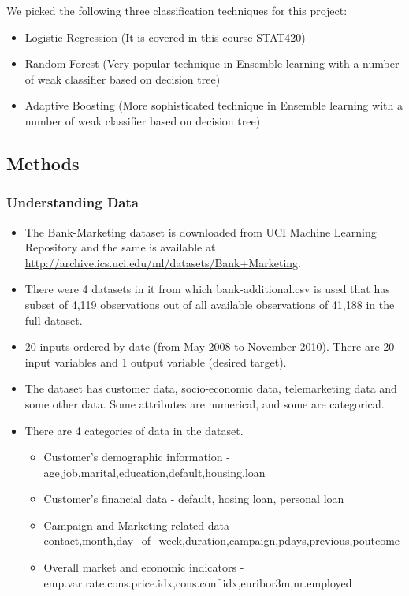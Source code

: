 \documentclass[
]{article}
\begin{document}
We picked the following three classification techniques for this
project:

\begin{itemize}
\item
  Logistic Regression (It is covered in this course STAT420)
\item
  Random Forest (Very popular technique in Ensemble learning with a
  number of weak classifier based on decision tree)
\item
  Adaptive Boosting (More sophisticated technique in Ensemble learning
  with a number of weak classifier based on decision tree)
\end{itemize}

\hypertarget{methods}{%
\subsection{Methods}\label{methods}}

\hypertarget{understanding-data}{%
\subsubsection{Understanding Data}\label{understanding-data}}

\begin{itemize}
\item
  The Bank-Marketing dataset is downloaded from UCI Machine Learning
  Repository and the same is available at
  \url{http://archive.ics.uci.edu/ml/datasets/Bank+Marketing}.
\item
  There were 4 datasets in it from which bank-additional.csv is used
  that has subset of 4,119 observations out of all available
  observations of 41,188 in the full dataset.
\item
  20 inputs ordered by date (from May 2008 to November 2010). There are
  20 input variables and 1 output variable (desired target).
\item
  The dataset has customer data, socio-economic data, telemarketing data
  and some other data. Some attributes are numerical, and some are
  categorical.
\item
  There are 4 categories of data in the dataset.

  \begin{itemize}
  \item
    Customer's demographic information -
    age,job,marital,education,default,housing,loan
  \item
    Customer's financial data - default, hosing loan, personal loan
  \item
    Campaign and Marketing related data -
    contact,month,day\_of\_week,duration,campaign,pdays,previous,poutcome
  \item
    Overall market and economic indicators -
    emp.var.rate,cons.price.idx,cons.conf.idx,euribor3m,nr.employed
  \end{itemize}
\end{itemize}
\end{document}
